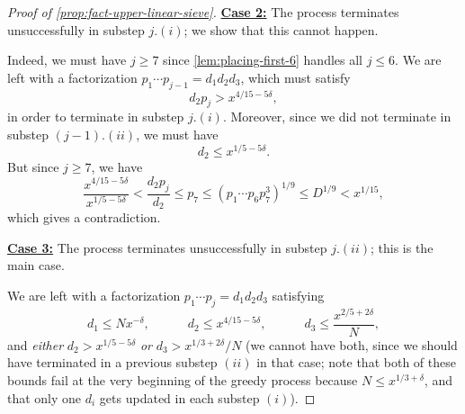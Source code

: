 \documentclass[reqno,11pt]{amsart}
\theoremstyle{remark}
\numberwithin{equation}{section}
\begin{document}
\begin{proof}[Proof of \cref{prop:fact-upper-linear-sieve}]
\underline{\textbf{Case 2:}} The process terminates unsuccessfully in substep $j.(i)$; we show that this cannot happen.

Indeed, we must have $j \ge 7$ since \cref{lem:placing-first-6} handles all $j \le 6$. We are left with a factorization $p_1 \cdots p_{j-1} = d_1 d_2 d_3$, which must satisfy
\[
    d_2 p_j > x^{4/15-5\delta},
\]
in order to terminate in substep $j.(i)$. Moreover, since we did not terminate in substep $(j-1).(ii)$, we must have
\[
    d_2 \le x^{1/5 - 5\delta}.
\]
But since $j \ge 7$, we have
\[
    \frac{x^{4/15-5\delta}}{x^{1/5-5\delta}} < \frac{d_2 p_j}{d_2} \le p_7 \le \left(p_1 \cdots p_6 p_7^3\right)^{1/9} 
    \le 
    D^{1/9} 
    <
    x^{1/15},
\]
which gives a contradiction.

\underline{\textbf{Case 3:}} The process terminates unsuccessfully in substep $j.(ii)$; this is the main case.

We are left with a factorization $p_1 \cdots p_j = d_1 d_2 d_3$ satisfying
\begin{equation} \label{eq:fact-satisfying}
    d_1 \le N x^{-\delta}, \qquad\quad 
    d_2 \le x^{4/15 - 5\delta}, \qquad\quad 
    d_3 \le \frac{x^{2/5 + 2\delta}}{N},
\end{equation}
and \emph{either} $d_2 > x^{1/5-5\delta}$ \emph{or} $d_3 > x^{1/3+2\delta}/N$ (we cannot have both, since we should have terminated in a previous substep $(ii)$ in that case; note that both of these bounds fail at the very beginning of the greedy process because $N \le x^{1/3+\delta}$, and that only one $d_i$ gets updated in each substep $(i)$).


\end{proof}
\end{document}
